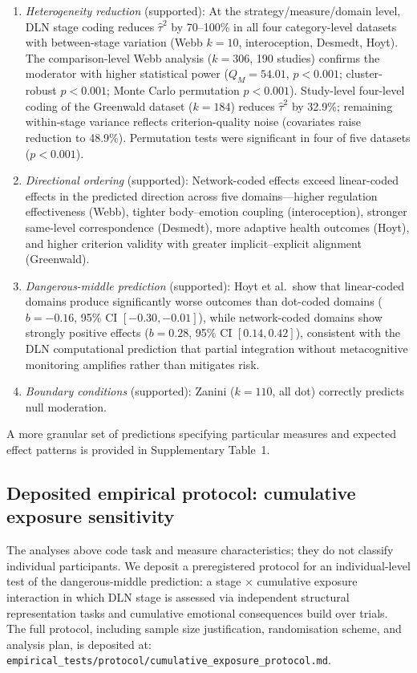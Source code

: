 \documentclass[11pt]{article}
\begin{document}
\begin{enumerate}[nosep]
\item \textit{Heterogeneity reduction} (supported): At the
strategy/measure/domain level, DLN stage coding reduces $\hat\tau^2$
by 70--100\% in all four category-level datasets with between-stage
variation (Webb $k = 10$, interoception, Desmedt, Hoyt). The
comparison-level Webb analysis ($k = 306$, 190 studies) confirms the
moderator with higher statistical power ($Q_M = 54.01$, $p < 0.001$;
cluster-robust $p < 0.001$; Monte Carlo permutation $p < 0.001$).
Study-level four-level coding of the Greenwald dataset ($k = 184$)
reduces $\hat\tau^2$ by 32.9\%; remaining within-stage variance
reflects criterion-quality noise (covariates raise reduction to
48.9\%). Permutation tests were significant in four of five datasets
($p < 0.001$).
\item \textit{Directional ordering} (supported): Network-coded effects
exceed linear-coded effects in the predicted direction across five
domains---higher regulation effectiveness (Webb), tighter
body--emotion coupling (interoception), stronger same-level
correspondence (Desmedt), more adaptive health outcomes (Hoyt), and
higher criterion validity with greater implicit--explicit alignment
(Greenwald).
\item \textit{Dangerous-middle prediction} (supported): Hoyt et al.\
show that linear-coded domains produce significantly worse outcomes
than dot-coded domains ($b = -0.16$, 95\% CI $[-0.30, -0.01]$),
while network-coded domains show strongly positive effects ($b = 0.28$,
95\% CI $[0.14, 0.42]$), consistent with the DLN computational
prediction that partial integration without metacognitive monitoring
amplifies rather than mitigates risk.
\item \textit{Boundary conditions} (supported): Zanini ($k = 110$,
all dot) correctly predicts null moderation.
\end{enumerate}

\noindent A more granular set of predictions specifying particular
measures and expected effect patterns is provided in Supplementary
Table~1.


\subsection{Deposited empirical protocol: cumulative exposure
sensitivity}

The analyses above code task and measure characteristics; they do not
classify individual participants. We deposit a preregistered protocol
for an individual-level test of the dangerous-middle prediction: a
stage $\times$ cumulative exposure interaction in which DLN stage is
assessed via independent structural representation tasks and cumulative
emotional consequences build over trials\cite{Wu2026}. The full protocol,
including sample size justification, randomisation scheme, and analysis
plan, is deposited at:
\texttt{empirical\_tests/protocol/cumulative\_exposure\_protocol.md}.
\end{document}
